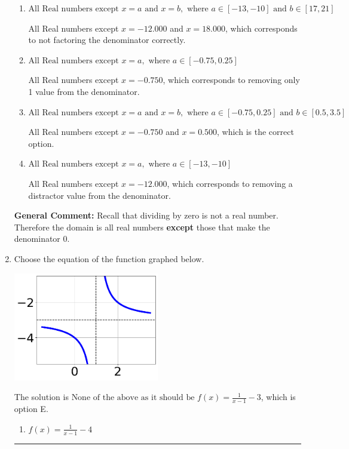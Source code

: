 \documentclass{extbook}[14pt]
\newcommand{\litem}[1]{\item #1

\rule{\textwidth}{0.4pt}}
\begin{document}
\begin{enumerate}
{\begin{enumerate}[label=\Alph*.]
This corresponds to thinking the denominator has complex roots or that rational functions have a domain of all Real numbers.
\item \( \text{All Real numbers except } x = a \text{ and } x = b, \text{ where } a \in [-13, -10] \text{ and } b \in [17, 21] \)

All Real numbers except $x = -12.000$ and $x = 18.000$, which corresponds to not factoring the denominator correctly.
\item \( \text{All Real numbers except } x = a, \text{ where } a \in [-0.75, 0.25] \)

All Real numbers except $x = -0.750$, which corresponds to removing only 1 value from the denominator.
\item \( \text{All Real numbers except } x = a \text{ and } x = b, \text{ where } a \in [-0.75, 0.25] \text{ and } b \in [0.5, 3.5] \)

All Real numbers except $x = -0.750$ and $x = 0.500$, which is the correct option.
\item \( \text{All Real numbers except } x = a, \text{ where } a \in [-13, -10] \)

All Real numbers except $x = -12.000$, which corresponds to removing a distractor value from the denominator.
\end{enumerate}

\textbf{General Comment:} Recall that dividing by zero is not a real number. Therefore the domain is all real numbers \textbf{except} those that make the denominator 0.
}
\litem{
Choose the equation of the function graphed below.

\begin{center}
    \includegraphics[width=0.5\textwidth]{../Figures/rationalGraphToEquationC.png}
\end{center}


The solution is \( \text{None of the above as it should be } f(x) = \frac{1}{x - 1} - 3 \), which is option E.\begin{enumerate}[label=\Alph*.]
\item \( f(x) = \frac{1}{x - 1} - 4 \)


\end{enumerate}}
\end{enumerate}
\end{document}
